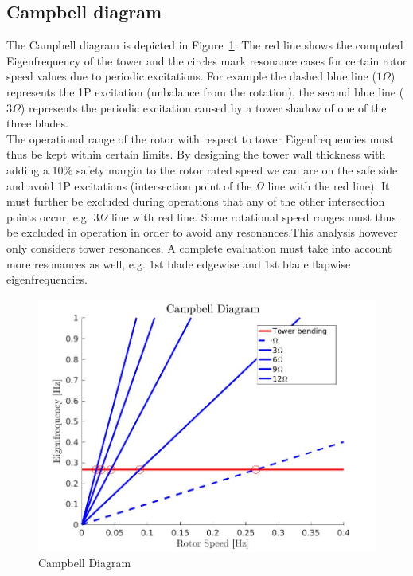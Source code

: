 \documentclass[10pt]{article}
\begin{document}
\subsection{Campbell diagram}
The Campbell diagram is depicted in Figure~\ref{fig:campbell}. The red line shows the computed Eigenfrequency of the tower and the circles mark resonance cases for certain rotor speed values due to periodic excitations. For example the dashed blue line ($1\Omega$) represents the 1P excitation (unbalance from the rotation), the second blue line ($3\Omega$) represents the periodic excitation caused by a tower shadow of one of the three blades.\\

The operational range of the rotor with respect to tower Eigenfrequencies must thus be kept within certain limits. By designing the tower wall thickness with adding a 10\% safety margin to the rotor rated speed we can are on the safe side and avoid 1P excitations (intersection point of the $\Omega$ line with the red line). It must further be excluded during operations that any of the other intersection points occur, e.g. $3\Omega$ line with red line. Some rotational speed ranges must thus be excluded in operation in order to avoid any resonances.This analysis however only considers tower resonances. A complete evaluation must take into account more resonances as well, e.g. 1st blade edgewise and 1st blade flapwise eigenfrequencies. \\

\begin{figure}[H]
\centering
\includegraphics[width=1\linewidth]{../CIP_4/figures/campbell.jpg}
\caption{Campbell Diagram}
\label{fig:campbell}
\end{figure} 
\end{document}
